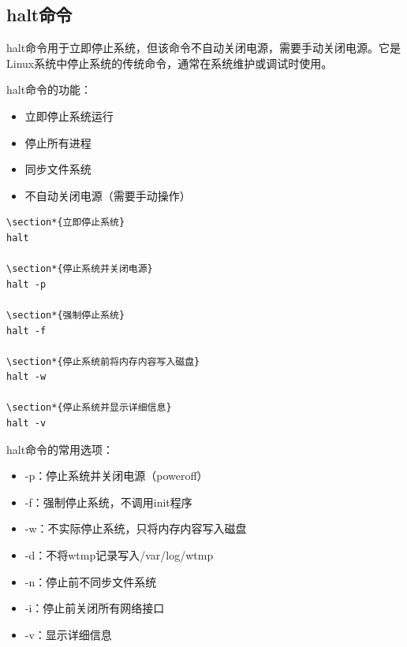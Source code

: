 \documentclass[12pt,UTF8]{ctexbook}
\begin{document}
\subsection{halt命令}
halt命令用于立即停止系统，但该命令不自动关闭电源，需要手动关闭电源。它是Linux系统中停止系统的传统命令，通常在系统维护或调试时使用。

halt命令的功能：
\begin{itemize}
    \item 立即停止系统运行
    \item 停止所有进程
    \item 同步文件系统
    \item 不自动关闭电源（需要手动操作）
\end{itemize}

\begin{verbatim}
\section*{立即停止系统}
halt

\section*{停止系统并关闭电源}
halt -p

\section*{强制停止系统}
halt -f

\section*{停止系统前将内存内容写入磁盘}
halt -w

\section*{停止系统并显示详细信息}
halt -v
\end{verbatim}

halt命令的常用选项：
\begin{itemize}
    \item -p：停止系统并关闭电源（poweroff）
    \item -f：强制停止系统，不调用init程序
    \item -w：不实际停止系统，只将内存内容写入磁盘
    \item -d：不将wtmp记录写入/var/log/wtmp
    \item -n：停止前不同步文件系统
    \item -i：停止前关闭所有网络接口
    \item -v：显示详细信息
\end{itemize}
\end{document}
